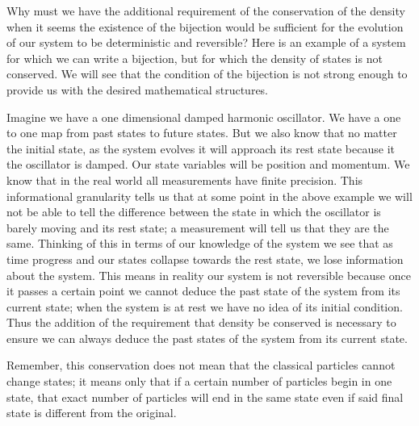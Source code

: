 \documentclass{article}
\begin{document}
	Why must we have the additional requirement of the conservation of the density when it seems the existence of the bijection would be sufficient for the evolution of our system to be deterministic and reversible? Here is an example of a system for which we can write a bijection, but for which the density of states is not conserved. We will see that the condition of the bijection is not strong enough to provide us with the desired mathematical structures.
	
	Imagine we have a one dimensional damped harmonic oscillator. We have a one to one map from past states to future states. But we also know that no matter the initial state, as the system evolves it will approach its rest state because it the oscillator is damped. Our state variables will be position and momentum. We know that in the real world all measurements have finite precision. This informational granularity tells us that at some point in the above example we will not be able to tell the difference between the state in which the oscillator  is barely moving and its rest state; a measurement will tell us that they are the same. Thinking of this in terms of our knowledge of the system we see that as time progress and our states collapse towards the rest state, we lose information about the system. This means in reality our system is not reversible because once it passes a certain point we cannot deduce the past state of the system from its current state; when the system is at rest we have no idea of its initial condition. Thus the addition of the requirement that density be conserved is necessary to ensure we can always deduce the past states of the system from its current state.
	
	Remember, this conservation does not mean that the classical particles cannot change states; it means only that if a certain number of particles begin in one state, that exact number of particles will end in the same state even if said final state is different from the original.
	
\end{document}
